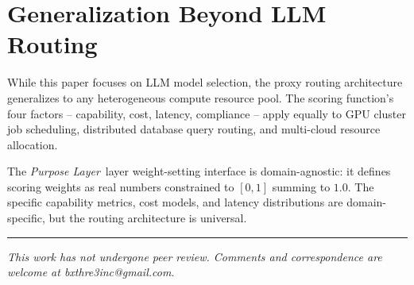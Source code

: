 \documentclass[12pt]{article}
\newcommand{\purpose}{\textit{Purpose Layer}}
\begin{document}
\section{Generalization Beyond LLM Routing}
\label{sec:generalization}

While this paper focuses on LLM model selection, the proxy routing architecture generalizes to any heterogeneous compute resource pool. The scoring function's four factors -- capability, cost, latency, compliance -- apply equally to GPU cluster job scheduling, distributed database query routing, and multi-cloud resource allocation.

The \purpose\ layer weight-setting interface is domain-agnostic: it defines scoring weights as real numbers constrained to $[0, 1]$ summing to $1.0$. The specific capability metrics, cost models, and latency distributions are domain-specific, but the routing architecture is universal.





\vspace{2em}
\hrule
\vspace{0.5em}
\noindent\small\textit{This work has not undergone peer review. Comments and correspondence are welcome at bxthre3inc@gmail.com.}
\end{document}
